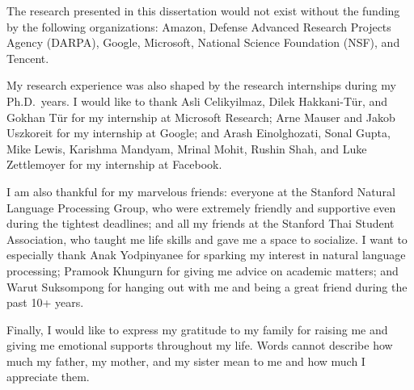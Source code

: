 The research presented in this dissertation
would not exist without the funding by the following organizations:
Amazon,
Defense Advanced Research Projects Agency (DARPA),
Google,
Microsoft,
National Science Foundation (NSF),
and Tencent.

My research experience was also shaped by the research internships
during my Ph.D.\ years.
I would like to thank Asli Celikyilmaz,
Dilek Hakkani-T\"ur,
and Gokhan T\"ur
for my internship at Microsoft Research;
Arne Mauser and Jakob Uszkoreit
for my internship at Google;
and Arash Einolghozati, Sonal Gupta, 
Mike Lewis, Karishma Mandyam, 
Mrinal Mohit, Rushin Shah, and Luke Zettlemoyer
for my internship at Facebook.

I am also thankful for my marvelous friends:
everyone at the Stanford Natural Language Processing Group,
who were extremely friendly and supportive
even during the tightest deadlines;
and all my friends at the Stanford Thai Student Association,
who taught me life skills and gave me a space to socialize.
I want to especially thank
Anak Yodpinyanee for sparking my interest in natural language processing;
Pramook Khungurn for giving me advice on academic matters;
and
Warut Suksompong for hanging out with me
and being a great friend
during the past 10+ years.

Finally, I would like to express my gratitude to my family
for raising me and giving me emotional supports throughout my life.
Words cannot describe how much my father, my mother, and my sister
mean to me and how much I appreciate them.
